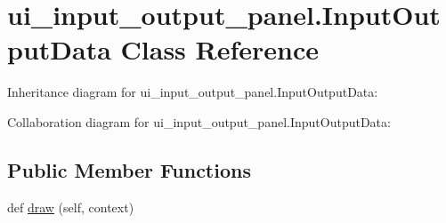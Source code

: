 \hypertarget{classui__input__output__panel_1_1InputOutputData}{}\section{ui\+\_\+input\+\_\+output\+\_\+panel.\+Input\+Output\+Data Class Reference}
\label{classui__input__output__panel_1_1InputOutputData}


 




Inheritance diagram for ui\+\_\+input\+\_\+output\+\_\+panel.\+Input\+Output\+Data\+:


Collaboration diagram for ui\+\_\+input\+\_\+output\+\_\+panel.\+Input\+Output\+Data\+:
\subsection*{Public Member Functions}
\begin{DoxyCompactItemize}
\item 
def \hyperlink{classui__input__output__panel_1_1InputOutputData_a211ed25a253470bdf0ac2f001524dbc0}{draw} (self, context)
\end{DoxyCompactItemize}

